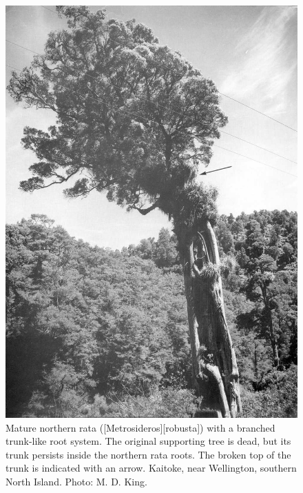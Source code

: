 \begin{figure}[!htb]
	\centering
	\begin{minipage}[t]{0.525\textwidth}
		\centering
		\includegraphics[width=\textwidth]{graphics/figure52rata-branched.jpg}
    	\caption[Mature northern rata with a branched trunk-like root system]{Mature northern rata ([Metrosideros][robusta]) with a branched trunk-like root system.
        The original supporting tree is dead, but its trunk persists inside the northern rata roots.
        The broken top of the trunk is indicated with an arrow.
        Kaitoke, near Wellington, southern North Island.
    	Photo: M. D. King.}%
    	\label{fig:52rata-branched}
	\end{minipage}\hfill%
	\begin{minipage}[t]{0.455\textwidth}
    	\centering

\end{minipage}
\end{figure}
